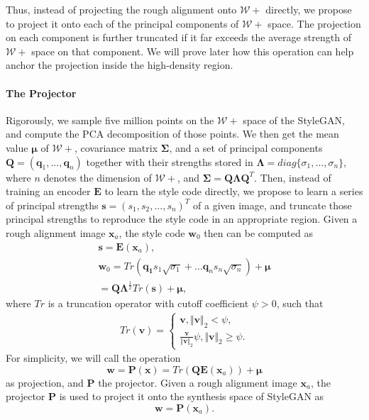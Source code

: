 \documentclass[10pt,twocolumn,letterpaper]{article}
\newcommand{\w}{\bm{w}}
\newcommand{\x}{\bm{x}}
\begin{document}
Thus, instead of projecting the rough alignment onto $\mathcal{W}+$ directly, we propose to project it onto each of the principal components of $\mathcal{W}+$ space. The projection on each component is further truncated if it far exceeds the average strength of $\mathcal{W}+$ space on that component. We will prove later how this operation can help anchor the projection inside the high-density region. 

\newcommand{\q}{\bm{q}}

\paragraph{The Projector} Rigorously, we sample five million points on the $\mathcal{W}+$ space of the StyleGAN, and compute the PCA decomposition \cite{wold1987principal} of those points. We then get the mean value $\bm{\mu}$ of $\mathcal{W}+$, covariance matrix $\bm{\Sigma}$, and a set of principal components $\bm{Q}=(\q_1,...,\q_n)$ together with their strengths stored in $\bm{\Lambda}=diag\{\sigma_1,...,\sigma_n\}$, where $n$ denotes the dimension of $\mathcal{W}+$, and $\bm{\Sigma}=\bm{Q}\bm{\Lambda}\bm{Q}^T$. Then, instead of training an encoder $\bm{E}$ to learn the style code directly, we propose to learn a series of principal strengths $\bm{s}=(s_1,s_2,...,s_n)^T$ of a given image, and truncate those principal strengths to reproduce the style code in an appropriate region. Given a rough alignment image $\bm{x}_a$, the style code $\w_0$ then can be computed as\begin{gather}
    \bm{s}=\bm{E}(\x_a),\\
     \w_0=Tr(\bm{q_1}s_1\sqrt{\sigma_1}+...\bm{q}_n s_n\sqrt{\sigma_n})+\bm{\mu}\\
     =\bm{Q}\bm{\Lambda}^{\frac{1}{2}}Tr(\bm{s})+\bm{\mu},\end{gather}
where $Tr$ is a truncation operator with cutoff coefficient $\psi>0$, such that\begin{align}
Tr(\bm{v})=
\left\{\begin{array}{ll}
     \bm{v}, \Vert \bm{v}\Vert_2<\psi,\\
     \frac{\bm{v}}{\Vert\bm{v}\Vert_2}\psi, \Vert \bm{v}\Vert_2\geq\psi.
\end{array}\right.\end{align}
For simplicity, we will call the operation\begin{equation}
    \w=\bm{P}(\x)=Tr(\bm{Q}\bm{E}(\x_a))+\bm{\mu}\end{equation}
as projection, and $\bm{P}$ the projector. Given a rough alignment image $\bm{x}_a$, the projector $\bm{P}$ is used to project it onto the synthesis space of StyleGAN as \begin{equation}
    \w = \bm{P}(\x_a).\end{equation}
\end{document}
